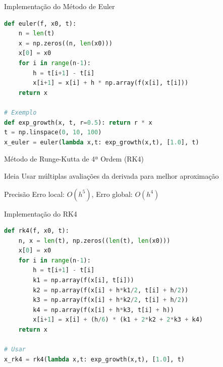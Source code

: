 \begin{frame}{Implementação do Método de Euler}
\begin{lstlisting}[language=Python, caption=Euler forward, basicstyle=\ttfamily\footnotesize]
def euler(f, x0, t):
    n = len(t)
    x = np.zeros((n, len(x0)))
    x[0] = x0
    for i in range(n-1):
        h = t[i+1] - t[i]
        x[i+1] = x[i] + h * np.array(f(x[i], t[i]))
    return x

# Exemplo
def exp_growth(x, t, r=0.5): return r * x
t = np.linspace(0, 10, 100)
x_euler = euler(lambda x,t: exp_growth(x,t), [1.0], t)
\end{lstlisting}
\end{frame}

\begin{frame}[allowframebreaks]{Método de Runge-Kutta de 4ª Ordem (RK4)}
\begin{block}{Ideia}
Usar múltiplas avaliações da derivada para melhor aproximação
\end{block}


\begin{exampleblock}{Precisão}
Erro local: $O(h^5)$, Erro global: $O(h^4)$
\end{exampleblock}
\end{frame}

\begin{frame}{Implementação do RK4}
\begin{lstlisting}[language=Python, caption=Runge-Kutta 4, basicstyle=\ttfamily\footnotesize]
def rk4(f, x0, t):
    n, x = len(t), np.zeros((len(t), len(x0)))
    x[0] = x0
    for i in range(n-1):
        h = t[i+1] - t[i]
        k1 = np.array(f(x[i], t[i]))
        k2 = np.array(f(x[i] + h*k1/2, t[i] + h/2))
        k3 = np.array(f(x[i] + h*k2/2, t[i] + h/2))
        k4 = np.array(f(x[i] + h*k3, t[i] + h))
        x[i+1] = x[i] + (h/6) * (k1 + 2*k2 + 2*k3 + k4)
    return x

# Usar
x_rk4 = rk4(lambda x,t: exp_growth(x,t), [1.0], t)
\end{lstlisting}
\end{frame}

